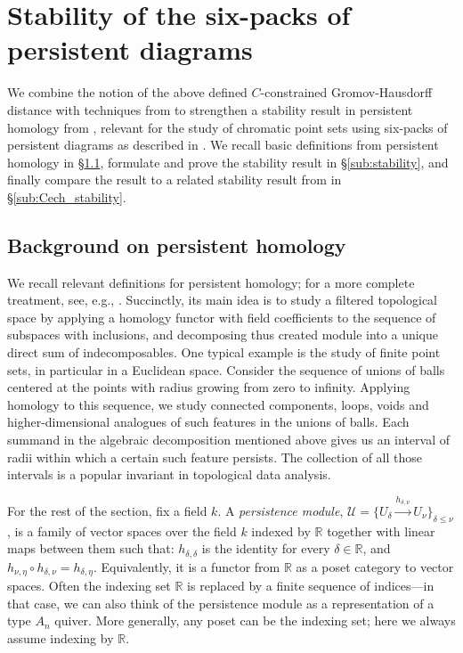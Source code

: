 \documentclass[8pt,a4paper,oneside,english,english]{article}
\theoremstyle{plain}
\theoremstyle
{plain}
\theoremstyle{definition}
\newcommand{\R}{\mathbb{R}}
\begin{document}
\section{Stability of the six-packs of persistent diagrams}\label{sec:stability}

We combine the notion of the above defined $C$-constrained Gromov-Hausdorff distance with techniques from \cite{ChoMem3} to strengthen a stability result in persistent homology from \cite{Coh-SteEdeHar, Coh-SteEdeHarMor}, relevant for the study of chromatic point sets using six-packs of persistent diagrams as described in \cite{CulDraEdeSag1}. We recall basic definitions from persistent homology in \S\ref{sub:ph-background}, formulate and prove the stability result in \S\ref{sub:stability}, and finally compare the result to a related stability result from \cite{Mem_tripods} in \S\ref{sub:Cech_stability}.

\subsection{Background on persistent homology}\label{sub:ph-background}

We recall relevant definitions for persistent homology; for a more complete treatment, see, e.g., \cite{EdeHar}. Succinctly, its main idea is to study a filtered topological space by applying a homology functor with field coefficients to the sequence of subspaces with inclusions, and decomposing thus created module into a unique direct sum of indecomposables. One typical example is the study of finite point sets, in particular in a Euclidean space. Consider the sequence of unions of balls centered at the points with radius growing from zero to infinity. Applying homology to this sequence, we study connected components, loops, voids and higher-dimensional analogues of such features in the unions of balls. Each summand in the algebraic decomposition mentioned above gives us an interval of radii within which a certain such feature persists. The collection of all those intervals is a popular invariant in topological data analysis.

For the rest of the section, fix a field $k$. A {\em persistence module}, $\mathcal U=\{U_\delta\xrightarrow{h_{\delta,\nu}}U_\nu\}_{\delta\leq\nu}$, is a family of vector spaces over the field $k$ indexed by $\R$ together with linear maps between them such that: $h_{\delta,\delta}$ is the identity for every $\delta\in\R$, and $h_{\nu,\eta}\circ h_{\delta,\nu}=h_{\delta,\eta}$. Equivalently, it is a functor from $\R$ as a poset category to vector spaces. Often the indexing set $\R$ is replaced by a finite sequence of indices---in that case, we can also think of the persistence module as a representation of a type $A_n$ quiver. More generally, any poset can be the indexing set;  here we always assume indexing by $\R$.
\end{document}
